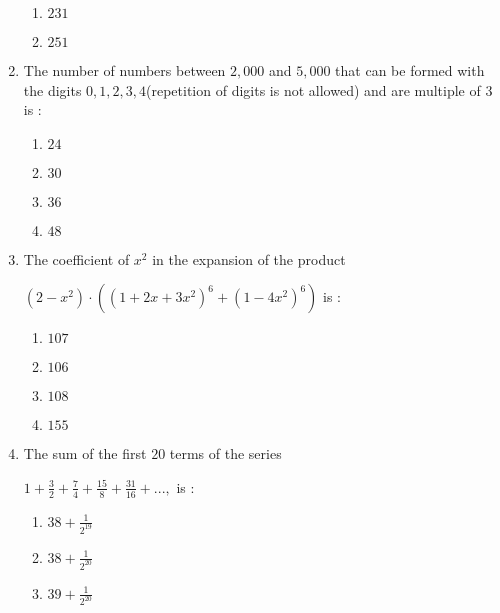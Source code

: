 \documentclass[journal,12pt,twocolumn]{IEEEtran}
\begin{document}
\begin{enumerate}[1.]
\begin{enumerate}[(1)]
\item $
231
$

\item $
251
$


\end{enumerate}

\item The number of numbers between $2,000$ and $5,000$ that can be formed with the digits $0,1,2,3,4$(repetition of digits is not allowed) and are multiple of $3$ is :



\begin{enumerate}[(1)]
 
\item $
24
$

\item $
30
$

\item $
36
$

\item $
48
$


\end{enumerate}


\item The coefficient of $x^2$ in the expansion of the product

$(2-x^2) \cdot ({(1+2x+3x^2)}^6+{(1-4x^2)}^6) $ is :


\begin{enumerate}[(1)]
 
\item $
107
$

\item $
106
$

\item $
108
$

\item $
155
$


\end{enumerate}

\item The sum of the first $20$ terms of the series

$1+\frac{3}{2}+\frac{7}{4}+\frac{15}{8}+\frac{31}{16}+...,$ is :


\begin{enumerate}[(1)]
 
\item $
38+\frac{1}{2^{19}}
$

\item $
38+\frac{1}{2^{20}}
$

\item $
39+\frac{1}{2^{20}}
$


\end{enumerate}
\end{enumerate}
\end{document}
